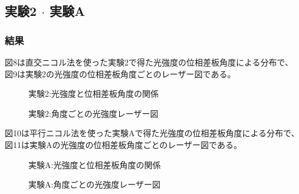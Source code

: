\documentclass{article}
\begin{document}
\subsection{実験2 $\cdot$ 実験A}
\subsubsection{結果}
\begin{spacing}{1.2}
    図8は直交ニコル法を使った実験2で得た光強度の位相差板角度による分布で、
    図9は実験2の光強度の位相差板角度ごとのレーザー図である。
\end{spacing}
\begin{figure}[htbp]
    \centering
    \begin{minipage}[b]{0.5\textwidth} %
      \centering
      \caption{実験2:光強度と位相差板角度の関係}
      \label{fig:8}
    \end{minipage}%
    \begin{minipage}[b]{0.5\textwidth}
      \centering
      \caption{実験2:角度ごとの光強度レーザー図}
      \label{fig:9}
    \end{minipage}
\end{figure}
\FloatBarrier

\begin{spacing}{1.2}
    図10は平行ニコル法を使った実験Aで得た光強度の位相差板角度による分布で、
    図11は実験Aの光強度の位相差板角度ごとのレーザー図である。
\end{spacing}
\begin{figure}[htbp]
    \centering
    \begin{minipage}[b]{0.5\textwidth} %
      \centering
      \caption{実験A:光強度と位相差板角度の関係}
      \label{fig:10}
    \end{minipage}%
    \begin{minipage}[b]{0.5\textwidth}
      \centering
      \caption{実験A:角度ごとの光強度レーザー図}
      \label{fig:11}
    \end{minipage}
\end{figure}
\FloatBarrier
\end{document}
